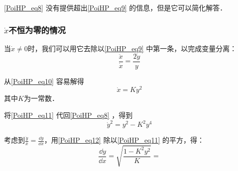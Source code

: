 \autoref{PoiHP_eq8} 没有提供超出\autoref{PoiHP_eq9} 的信息，但是它可以简化解答．

\subsubsection{$\dot{x}$不恒为零的情况}

{}%

当$\dot{x}\ne 0$时，我们可以用它去除以\autoref{PoiHP_eq9} 中第一条，以完成变量分离：
\begin{equation}\label{PoiHP_eq10}
\frac{\ddot{x}}{\dot{x}}=\frac{2\dot{y}}{y}
\end{equation}

从\autoref{PoiHP_eq10} 容易解得
\begin{equation}\label{PoiHP_eq11}
\dot{x}=Ky^2
\end{equation}
其中$K$为一常数．

将\autoref{PoiHP_eq11} 代回\autoref{PoiHP_eq8} ，得到
\begin{equation}\label{PoiHP_eq12}
\dot{y}^2=y^2-K^2y^4
\end{equation}

考虑到$\frac{\dot{y}}{\dot{x}}=\frac{\dd y}{\dd x}$，用\autoref{PoiHP_eq12} 除以\autoref{PoiHP_eq11} 的平方，得：
\begin{equation}
\frac{\dd y}{\dd x}=\sqrt{\frac{1-K^2y^2}{K}}=
\end{equation}














